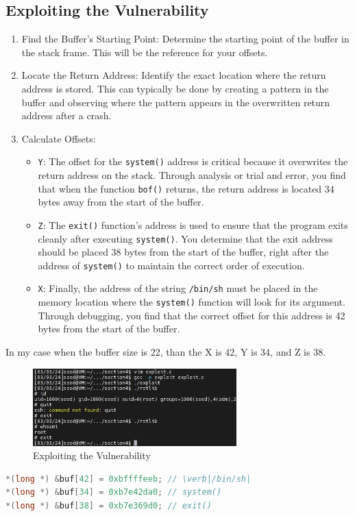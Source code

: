 \documentclass[a4paper,11pt]{article}
\begin{document}
\subsection{Exploiting the Vulnerability}
\begin{enumerate}
    \item Find the Buffer's Starting Point: Determine the starting point of the buffer in the stack frame. This will be the reference for your offsets.
    \item Locate the Return Address: Identify the exact location where the return address is stored. This can typically be done by creating a pattern in the buffer and observing where the pattern appears in the overwritten return address after a crash.
    \item Calculate Offsets: 
    \begin{itemize}  
        \item \verb|Y|: The offset for the \verb|system()| address is critical because it overwrites the return address on the stack. Through analysis or trial and error, you find that when the function \verb|bof()| returns, the return address is located 34 bytes away from the start of the buffer.
        \item \verb|Z|: The \verb|exit()| function's address is used to ensure that the program exits cleanly after executing \verb|system()|. You determine that the exit address should be placed 38 bytes from the start of the buffer, right after the address of \verb|system()| to maintain the correct order of execution.
        \item \verb|X|: Finally, the address of the string \verb|/bin/sh| must be placed in the memory location where the \verb|system()| function will look for its argument. Through debugging, you find that the correct offset for this address is 42 bytes from the start of the buffer.
    \end{itemize}
\end{enumerate}

In my case when the buffer size is 22, than the X is 42, Y is 34, and Z is 38.

\begin{figure}[h]
    \centering
       \includegraphics[width=0.7\textwidth]{figures/task19/task19.png}
    \caption{Exploiting the Vulnerability}\label{fig:task19}
\end{figure}
\begin{lstlisting}[caption={exploit.c major part},label={lst:task4.19},language=C,breaklines=true]
*(long *) &buf[42] = 0xbffffeeb; // \verb|/bin/sh|
*(long *) &buf[34] = 0xb7e42da0; // system()
*(long *) &buf[38] = 0xb7e369d0; // exit()
\end{lstlisting} 
\end{document}
